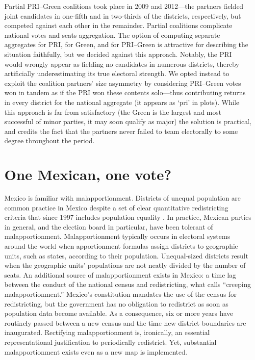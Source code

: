 \documentclass[letter,12pt]{article}
\begin{document}
Partial PRI--Green coalitions took place in 2009 and 2012---the partners fielded joint candidates in one-fifth and in two-thirds of the districts, respectively, but competed against each other in the remainder. Partial coalitions complicate national votes and seats aggregation. The option of computing separate aggregates for PRI, for Green, and for PRI--Green is attractive for describing the situation faithfully, but we decided against this approach. Notably, the PRI would wrongly appear as fielding no candidates in numerous districts, thereby artificially underestimating its true electoral strength. We opted instead to exploit the coalition partners' size asymmetry by considering PRI--Green votes won in tandem as if the PRI won these contents solo---thus contributing returns in every district for the national aggregate (it appears as `pri' in plots). While this approach is far from satisfactory (the Green is the largest and most successful of minor parties, it may soon qualify as major) the solution is practical, and credits the fact that the partners never failed to team electorally to some degree throughout the period. 

\section{One Mexican, one vote?}


Mexico is familiar with malapportionment. Districts of unequal population are common practice in Mexico despite a set of clear quantitative redistricting criteria that since 1997 includes population equality \citep{altman.magar.mcd.trelles2014apsa}. In practice, Mexican parties in general, and the election board in particular, have been tolerant of malapportionment. Malapportionment typically occurs in electoral systems around the world when apportionment formulas assign districts to geographic units, such as states, according to their population. Unequal-sized districts result when the geographic units' populations are not neatly divided by the number of seats. An additional source of malapportionment exists in Mexico: a time lag between the conduct of the national census and redistricting, what \citet{JohnstonCreepingMal} calls ``creeping malapportionment.'' Mexico's constitution mandates the use of the census for redistricting, but the government has no obligation to redistrict as soon as population data become available. As a consequence, six or more years have routinely passed between a new census and the time new district boundaries are inaugurated. Rectifying malapportionment is, ironically, an essential representational justification to periodically redistrict. Yet, substantial malapportionment exists  even as a new map is implemented. 
\end{document}
